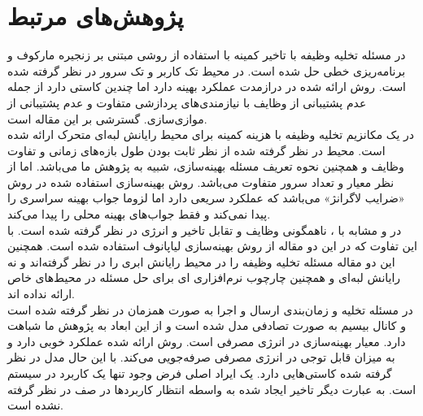 \section{پژوهش‌های مرتبط}
در \cite{Liu} مسئله تخلیه وظیفه با تاخیر کمینه با استفاده از روشی مبتنی بر زنجیره مارکوف و برنامه‌ریزی خطی حل شده است. در \CurrentProject محیط تک کاربر و تک سرور در نظر گرفته شده است. روش ارائه شده در درازمدت عملکرد بهینه دارد اما چندین کاستی دارد از جمله عدم پشتیبانی از وظایف با نیازمندی‌های پردازشی متفاوت و عدم پشتیبانی از موازی‌سازی. \CurrentProject گسترشی بر این مقاله است. \\

در \cite{samanta} یک مکانزیم تخلیه وظیفه با هزینه کمینه برای محیط رایانش لبه‌ای متحرک ارائه شده است. محیط در نظر گرفته شده از نظر ثابت بودن طول بازه‌های زمانی و تفاوت وظایف و همچنین نحوه تعریف مسئله بهینه‌سازی، شبیه به پژوهش ما می‌باشد. اما از نظر معیار و تعداد سرور متفاوت می‌باشد. روش بهینه‌سازی استفاده شده در \CurrentProject روش «ضرایب لاگرانژ» می‌باشد که عملکرد سریعی دارد اما لزوما جواب بهینه سراسری را پیدا نمی‌کند و فقط جواب‌های بهینه محلی را پیدا می‌کند. \\

در \cite{kwak} و \cite{jiang} مشابه با \CurrentProject، ناهمگونی وظایف و تقابل تاخیر و انرژی در نظر گرفته شده است. با این تفاوت که در این دو مقاله از روش بهینه‌سازی لیاپانوف استفاده شده است. همچنین این دو مقاله مسئله تخلیه وظیفه را در محیط رایانش ابری را در نظر گرفته‌اند و نه رایانش لبه‌ای و همچنین چارچوب نرم‌افزاری ای برای حل مسئله در محیط‌های خاص ارائه نداده اند. \\

در \cite{zhang2013} مسئله تخلیه و زمان‌بندی ارسال و اجرا به صورت همزمان در نظر گرفته شده است و کانال بیسیم به صورت تصادفی مدل شده است و از این ابعاد به پژوهش ما شباهت دارد. معیار بهینه‌سازی در \CurrentProject انرژی مصرفی است. روش ارائه شده عملکرد خوبی دارد و به میزان قابل توجی در انرژی مصرفی صرفه‌جویی می‌کند. با این حال مدل در نظر گرفته شده کاستی‌هایی دارد. یک ایراد اصلی فرض وجود تنها یک کاربرد در سیستم است. به عبارت دیگر تاخیر ایجاد شده به واسطه انتظار کاربردها در صف در نظر گرفته نشده است.

\clearpage
